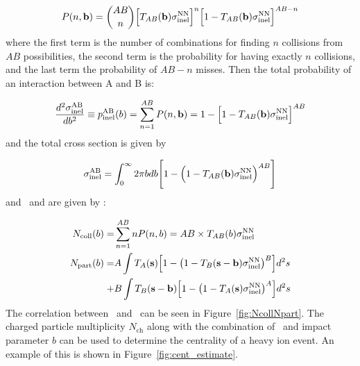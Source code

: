 \begin{align}
P(n, { \bf b}) = {{AB} \choose {n}} \Big[T_{AB}( {\bf b} ) \sigma_{\mathrm{inel}}^{\mathrm{NN}} \Big]^n \Big[ 1 - T_{AB}( {\bf b} ) \sigma_{\mathrm{inel}}^{\mathrm{NN}} \Big]^{AB-n}
\end{align}
where the first term is the number of combinations for finding $n$ collisions from $AB$ possibilities, the second term is the probability for having exactly $n$ collisions, and the last term the probability of $AB-n$ misses.
Then the total probability of an interaction between A and B is:

\begin{align}
\frac{d^2  \sigma_{\mathrm{inel}}^{\mathrm{AB}} }{db^2} \equiv p_{\mathrm{inel}}^{\mathrm{AB}} (b) = \sum_{n=1}^{AB} P(n, {\bf b}) = 1- \Big[ 1 - T_{AB}( {\bf b} ) \sigma_{\mathrm{inel}}^{\mathrm{NN}} \Big]^{AB}
\end{align}
and the total cross section is given by

\begin{align}
\sigma_{\mathrm{inel}}^{\mathrm{AB}} = \int_0^\infty 2\pi b db \Bigg[ 1- \Big( 1 - T_{AB}( {\bf b} ) \sigma_{\mathrm{inel}}^{\mathrm{NN}}  \Big)^{AB} \Bigg]
\end{align}
and \Ncoll\ and \Npart are given by \cite{Kharzeev:2000ph, Bialas:1976ed}:

\begin{align}
\mbox{$N_{\mathrm{coll}}$} (b) = & \sum_{n=1}^{AB} n P(n, b) =  AB \times T_{AB}(b) \sigma_{\mathrm{inel}}^{\mathrm{NN}} \\
\mbox{$N_{\mathrm{part}}$} (b) = & A \int T_A ({\bf s}) \Big[ 1 - \big(1-T_B ({\bf s - b}) \sigma_{\mathrm{inel}}^{\mathrm{NN}} \big)^B \Big] d^2 s \\
+ & B \int T_B ({\bf s-b}) \Big[ 1 - \big(1-T_A ({\bf s}) \sigma_{\mathrm{inel}}^{\mathrm{NN}} \big)^A \Big] d^2 s \nonumber
\end{align}
The correlation between \Ncoll\ and \Npart\ can be seen in Figure~\ref{fig:NcollNpart}.
The charged particle multiplicity $N_{\mathrm{ch}}$ along with the combination of \Npart\ and impact parameter $b$ can be used to determine the centrality of a heavy ion event.
An example of this is shown in Figure~\ref{fig:cent_estimate}.

